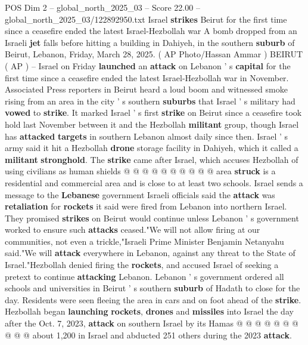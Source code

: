 \begin{textsample}{POS Dim 2 – global\_north\_2025\_03 – Score 22.00 – global\_north\_2025\_03/122892950.txt}  \label{ex:f2_pos_411}
Israel \textbf{strikes} Beirut for the first time since a ceasefire ended the latest Israel-Hezbollah war A bomb dropped from an Israeli \textbf{jet} falls before hitting a building in Dahiyeh, in the southern \textbf{suburb} of Beirut, Lebanon, Friday, March 28, 2025. ( AP Photo/Hassan Ammar ) BEIRUT ( AP ) -- Israel on Friday \textbf{launched} an \textbf{attack} on Lebanon ' s \textbf{capital} for the first time since a ceasefire ended the latest Israel-Hezbollah war in November.
Associated Press reporters in Beirut heard a loud boom and witnessed smoke rising from an area in the city ' s southern \textbf{suburbs} that Israel ' s military had \textbf{vowed} to \textbf{strike}.
It marked Israel ' s first \textbf{strike} on Beirut since a ceasefire took hold last November between it and the Hezbollah \textbf{militant} group, though Israel has \textbf{attacked} \textbf{targets} in southern Lebanon almost daily since then.
Israel ' s army said it hit a Hezbollah \textbf{drone} storage facility in Dahiyeh, which it called a \textbf{militant} \textbf{stronghold}.
The \textbf{strike} came after Israel, which accuses Hezbollah of using civilians as human shields @ @ @ @ @ @ @ @ @ @ area \textbf{struck} is a residential and commercial area and is close to at least two schools.
Israel sends a message to the \textbf{Lebanese} government Israeli officials said the \textbf{attack} was \textbf{retaliation} for \textbf{rockets} it said were fired from Lebanon into northern Israel.
They promised \textbf{strikes} on Beirut would continue unless Lebanon ' s government worked to ensure such \textbf{attacks} ceased."We will not allow firing at our communities, not even a trickle,"Israeli Prime Minister Benjamin Netanyahu said."We will \textbf{attack} everywhere in Lebanon, against any threat to the State of Israel."Hezbollah denied firing the \textbf{rockets}, and accused Israel of seeking a pretext to continue \textbf{attacking} Lebanon.
Lebanon ' s government ordered all schools and universities in Beirut ' s southern \textbf{suburb} of Hadath to close for the day.
Residents were seen fleeing the area in cars and on foot ahead of the \textbf{strike}.
Hezbollah began \textbf{launching} \textbf{rockets}, \textbf{drones} and \textbf{missiles} into Israel the day after the Oct. 7, 2023, \textbf{attack} on southern Israel by its Hamas @ @ @ @ @ @ @ @ @ @ about 1,200 in Israel and abducted 251 others during the 2023 \textbf{attack}.

\end{textsample}
